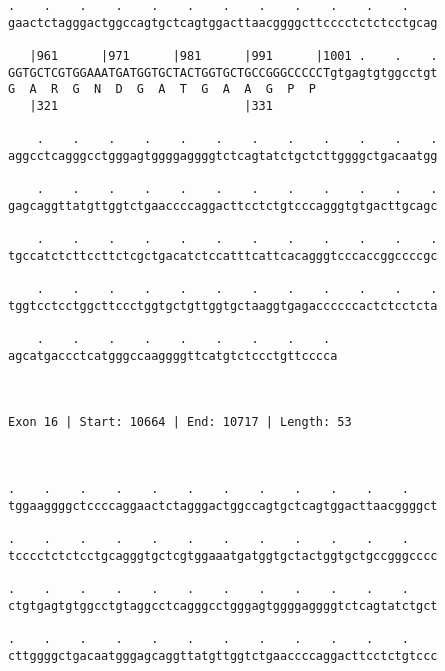 \documentclass{article}
\begin{document}
\begin{Verbatim}
.    .    .    .    .    .    .    .    .    .    .    .    
gaactctagggactggccagtgctcagtggacttaacggggcttcccctctctcctgcag
                                                            
   |961      |971      |981      |991      |1001 .    .    .
GGTGCTCGTGGAAATGATGGTGCTACTGGTGCTGCCGGGCCCCCTgtgagtgtggcctgt
G  A  R  G  N  D  G  A  T  G  A  A  G  P  P                 
   |321                          |331                       
  
    .    .    .    .    .    .    .    .    .    .    .    .
aggcctcagggcctgggagtggggaggggtctcagtatctgctcttggggctgacaatgg
                                                            
    .    .    .    .    .    .    .    .    .    .    .    .
gagcaggttatgttggtctgaaccccaggacttcctctgtcccagggtgtgacttgcagc
                                                            
    .    .    .    .    .    .    .    .    .    .    .    .
tgccatctcttccttctcgctgacatctccatttcattcacagggtcccaccggccccgc
                                                            
    .    .    .    .    .    .    .    .    .    .    .    .
tggtcctcctggcttccctggtgctgttggtgctaaggtgagaccccccactctcctcta
                                                            
    .    .    .    .    .    .    .    .    . 
agcatgaccctcatgggccaaggggttcatgtctccctgttcccca
                                              
                                              
 
Exon 16 | Start: 10664 | End: 10717 | Length: 53



.    .    .    .    .    .    .    .    .    .    .    .    
tggaaggggctccccaggaactctagggactggccagtgctcagtggacttaacggggct
                                                            
.    .    .    .    .    .    .    .    .    .    .    .    
tcccctctctcctgcagggtgctcgtggaaatgatggtgctactggtgctgccgggcccc
                                                            
.    .    .    .    .    .    .    .    .    .    .    .    
ctgtgagtgtggcctgtaggcctcagggcctgggagtggggaggggtctcagtatctgct
                                                            
.    .    .    .    .    .    .    .    .    .    .    .    
cttggggctgacaatgggagcaggttatgttggtctgaaccccaggacttcctctgtccc
                                                            

\end{Verbatim}
\end{document}
